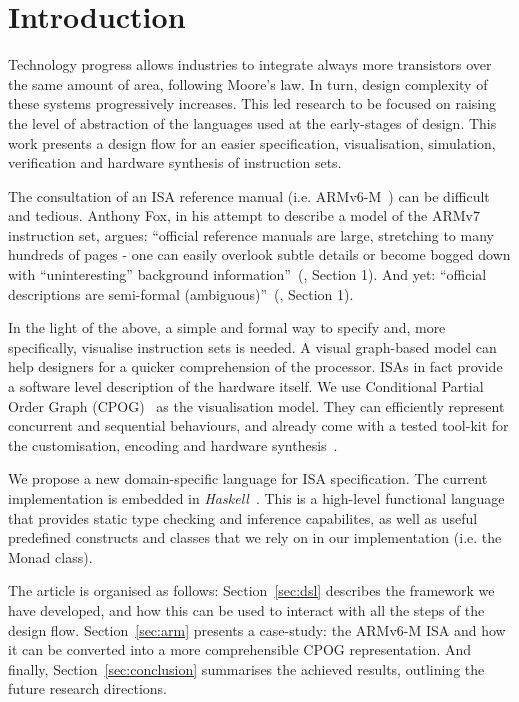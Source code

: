 \documentclass[conference]{IEEEtran}
\begin{document}
\IEEEpeerreviewmaketitle

\section{Introduction}
\label{sec:intro}
Technology progress allows industries to integrate always more transistors over the
same amount of area, following Moore's law. In turn, design complexity of these
systems progressively increases. This led research to be focused on raising the
level of abstraction of the languages used at the early-stages of design. This work
presents a design flow for an easier specification, visualisation, simulation,
verification and hardware synthesis of instruction sets.

The consultation of an ISA reference manual (i.e. ARMv6-M~\cite{armManual}) can be
difficult and tedious. Anthony Fox, in his attempt to describe a model
of the ARMv7 instruction set, argues: ``official reference manuals are large,
stretching to many hundreds of pages - one can easily overlook subtle details or
become bogged down with ``uninteresting'' background information''~(\cite{armv7},
Section 1). And yet: ``official descriptions are semi-formal (ambiguous)''~(\cite{armv7}, Section 1). 

In the light of the above, a simple and formal way to specify and, more
specifically, visualise instruction sets is needed. A visual graph-based model can
help designers for a quicker comprehension of the processor. ISAs in fact provide a
software level description of the hardware itself. We use Conditional Partial Order
Graph (CPOG)~\cite{cpog}\cite{andreyPhd} as the visualisation model. They can
efficiently represent concurrent and sequential behaviours, and already come with a
tested tool-kit for the customisation, encoding and hardware synthesis~\cite{workcraft}\cite{satEncoding}\cite{acsd}.

We propose a new domain-specific language for ISA specification. The current
implementation is embedded in \textit{Haskell}~\cite{haskell}. This is a high-level
functional language that provides static type checking and inference capabilites,
as well as useful predefined constructs and classes that we rely on in our
implementation (i.e. the Monad class).

The article is organised as follows: Section~\ref{sec:dsl} describes the framework
we have developed, and how this can be used to interact with all the steps of the 
design flow. Section~\ref{sec:arm} presents a case-study: the ARMv6-M ISA and how it
can be converted into a more comprehensible CPOG representation. 
And finally, Section~\ref{sec:conclusion} summarises the achieved results, 
outlining the future research directions.
\end{document}

